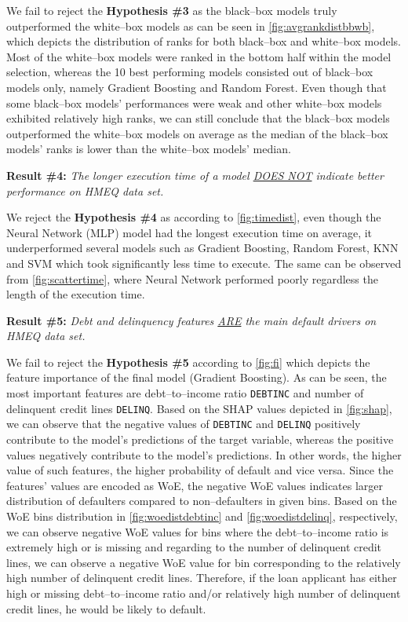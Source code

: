 We fail to reject the \textbf{Hypothesis \#3} as the black--box models truly outperformed the white--box models as can be seen in \autoref{fig:avgrankdistbbwb}, which depicts the distribution of ranks for both black--box and white--box models.
Most of the white--box models were ranked in the bottom half within the model selection, whereas the 10 best performing models consisted out of black--box models only, namely Gradient Boosting and Random Forest.
Even though that some black--box models' performances were weak and other white--box models exhibited relatively high ranks, we can still conclude that the black--box models outperformed the white--box models on average as the median of the black--box models' ranks is lower than the white--box models' median.
\vspace{0.3cm}

\noindent \textbf{Result \#4:} \textit{The longer execution time of a model \underline{DOES NOT} indicate better performance on HMEQ data set.}

We reject the \textbf{Hypothesis \#4} as according to \autoref{fig:timedist}, even though the Neural Network (MLP) model had the longest execution time on average, it underperformed several models such as Gradient Boosting, Random Forest, KNN and SVM which took significantly less time to execute. The same can be observed from \autoref{fig:scattertime}, where Neural Network performed poorly regardless the length of the execution time.
\vspace{0.3cm}

\noindent \textbf{Result \#5:} \textit{Debt and delinquency features \underline{ARE} the main default drivers on HMEQ data set.}

We fail to reject the \textbf{Hypothesis \#5} according to \autoref{fig:fi} which depicts the feature importance of the final model (Gradient Boosting). As can be seen, the most important features are debt--to--income ratio \texttt{DEBTINC} and number of delinquent credit lines \texttt{DELINQ}.
Based on the SHAP values depicted in \autoref{fig:shap}, we can observe that the negative values of \texttt{DEBTINC} and \texttt{DELINQ} positively contribute to the model's predictions of the target variable, whereas the positive values negatively contribute to the model's predictions.
In other words, the higher value of such features, the higher probability of default and vice versa.
Since the features' values are encoded as WoE, the negative WoE values indicates larger distribution of defaulters compared to non--defaulters in given bins.
Based on the WoE bins distribution in \autoref{fig:woedistdebtinc} and \autoref{fig:woedistdelinq}, respectively, we can observe negative WoE values for bins where the debt--to--income ratio is extremely high or is missing and regarding to the number of delinquent credit lines, we can observe a negative WoE value for bin corresponding to the relatively high number of delinquent credit lines.
Therefore, if the loan applicant has either high or missing debt--to--income ratio and/or relatively high number of delinquent credit lines, he would be likely to default.

